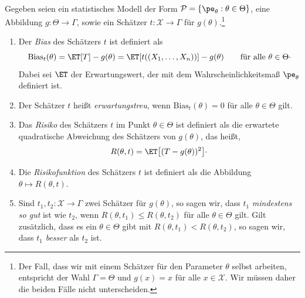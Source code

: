 \begin{defi}  \\
    Gegeben seien ein statistisches Modell der Form $\mathcal P=\{\pe_{\theta}:\theta\in\Theta\}$, eine Abbildung $g:\Theta\to\Gamma$, sowie ein \gls{Schätzer} $t:\mathcal X\to\Gamma$ für $g(\theta)$.\footnote{Der Fall, dass wir mit einem \gls{Schätzer} für den Parameter $\theta$ selbst arbeiten, entspricht der Wahl $\Gamma=\Theta$ und $g(x)=x$ für alle $x\in\mathcal X$. Wir müssen daher die beiden Fälle nicht unterscheiden.}

    \begin{enumerate}[label=(\alph*)]
        \item Der \emph{Bias} des \gls{Schätzer}s $t$ ist definiert als
        \[
            \mathrm{Bias}_t(\theta) = \ET[T] - g(\theta) = \ET[t((X_1,\dots,X_n))] - g(\theta) \qquad \text{für alle } \theta\in\Theta \cdot
        \]
        Dabei sei $\ET$ der Erwartungswert, der mit dem Wahrscheinlichkeitsmaß $\pe_{\theta}$ definiert ist.
        \item Der \gls{Schätzer} $t$ heißt \emph{erwartungstreu}, wenn $\mathrm{Bias}_t(\theta)=0$ für alle $\theta\in\Theta$ gilt.
        \item Das \emph{Risiko} des \gls{Schätzer}s $t$ im Punkt $\theta\in\Theta$ ist definiert als die erwartete quadratische Abweichung des \gls{Schätzer}s von $g(\theta)$, das heißt,
        \[
            R(\theta,t) = \ET\big[(T-g(\theta))^2\big] \cdot
        \]
        \item Die \emph{Risikofunktion} des \gls{Schätzer}s $t$ ist definiert als die Abbildung $\theta\mapsto R(\theta,t)$.
        \item Sind $t_1,t_2:\mathcal X\to\Gamma$ zwei \gls{Schätzer} für $g(\theta)$, so sagen wir, dass $t_1$ \emph{mindestens so gut} ist wie $t_2$, wenn $R(\theta,t_1)\leq R(\theta,t_2)$ für alle $\theta\in\Theta$ gilt.
        Gilt zusätzlich, dass es ein $\theta\in\Theta$ gibt mit $R(\theta,t_1)<R(\theta,t_2)$, so sagen wir, dass $t_1$ \emph{besser} als $t_2$ ist.
    \end{enumerate}
\end{defi}

